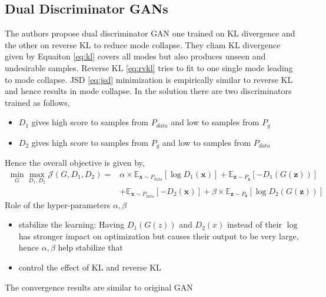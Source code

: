 \subsection*{Dual Discriminator GANs \citep{d2gan}} 
The authors propose dual discriminator GAN one trained on KL divergence and the other on reverse KL to reduce mode collapse. They cliam KL divergence given by Equaiton \ref{eq:kl} covers all modes but also produces unseen and undesirable samples. Reverse KL \ref{eq:rvkl} tries to fit to one single mode leading to mode collapse. JSD \ref{eq:jsd} minimization is empirically similar to reverse KL and hence results in mode collapse.
In the solution there are two discriminators trained as follows,
\begin{itemize}
    \item $D_1$ gives high score to samples from $P_{data}$ and low to samples from $P_g$
    \item $D_2$ gives high score to samples from $P_g$ and low to samples from $P_{data}$
\end{itemize}{}
Hence the overall objective is given by,
\begin{equation}
    \label{eq:d2gan}
    \begin{aligned} \min _{G} \max _{D_{1}, D_{2}} \mathcal{J}\left(G, D_{1}, D_{2}\right)= &\alpha \times \mathbb{E}_{\mathbf{x} \sim P_{\mathrm{data}}}\left[\log D_{1}(\mathbf{x})\right] 
    + \mathbb{E}_{\mathbf{z} \sim P_{\mathbf{z}}}\left[-D_{1}(G(\mathbf{z}))\right] \\ &+\mathbb{E}_{\mathbf{x} \sim P_{\mathrm{data}}}\left[-D_{2}(\mathbf{x})\right]
    +\beta \times \mathbb{E}_{\mathbf{z} \sim P_{\mathbf{z}}}\left[\log D_{2}(G(\mathbf{z}))\right] \end{aligned}
\end{equation}{}
Role of the hyper-parameters $\alpha, \beta$
\begin{itemize}
    \item stabilize the learning: Having $D_1(G(z))$ and $D_2(x)$ instead of their $\log$ has stronger impact on optimization but causes their output to be very large, hence $\alpha, \beta$ help stabilize that
    \item control the effect of KL and reverse KL
\end{itemize}{}
The convergence results are similar to original GAN

